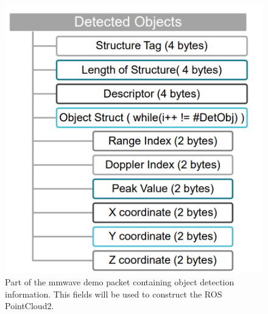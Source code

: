 \documentclass[12pt]{article}
\begin{document}
\begin{figure}[!htb]
    \centering
    \includegraphics[scale=0.7]{2_demo_vis_struct.PNG}
    \caption{Part of the mmwave demo packet containing object detection information. This fields will be used to construct the ROS PointCloud2.}
    \label{fig:my_label}
\end{figure}
\end{document}
